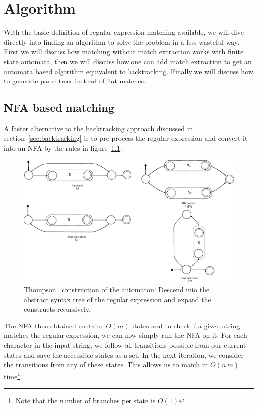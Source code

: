 \documentclass[11pt,a4paper,twoside,openright]{Thesis}
\theoremstyle{definition}
\newcommand{\Figref}[1]{figure~\ref{fig:#1}}
\newcommand{\Secref}[1]{section~\ref{sec:#1}}
\newcommand{\seclabel}[1]{\label{sec:#1}}
\begin{document}
\chapter{Algorithm} \seclabel{algo}
With the basic definition of regular expression matching available, we will 
dive directly into finding an algorithm to solve the problem in a less 
wasteful way. First we will discuss how matching without match extraction 
works with finite state automata, then we will discuss how one can add 
match extraction to get an automata based algorithm equivalent to backtracking.
Finally we will discuss how to generate parse trees instead of flat matches.

\section{NFA based matching}\label{sec:nfa-match}
A faster alternative to the backtracking approach discussed in
\Secref{backtracking} is to pre-process the regular expression and convert it
into an NFA by the rules in \Figref{thompson-construction-simple}.

\begin{figure}[htb] \includegraphics[width=\linewidth]{graphs/thompson-simple}
  \caption[Thompson construction]{Thompson~\cite{Thom68a} construction of the
automaton: Descend into the abstract syntax tree of the regular
expression and expand the constructs recursively.}
\label{fig:thompson-construction-simple}
\end{figure}

The NFA thus obtained contains $O(m)$ states and to check if a given string
matches the regular expression, we can now simply run the NFA on it. For each
character in the input string, we follow all transitions possible from our
current states and save the accessible states as a set. In the next
iteration, we consider the transitions from any of these states. This allows
us to match in $O(n\, m)$ time\footnote{Note that the number of branches per 
state is $O(1)$}.
\end{document}
